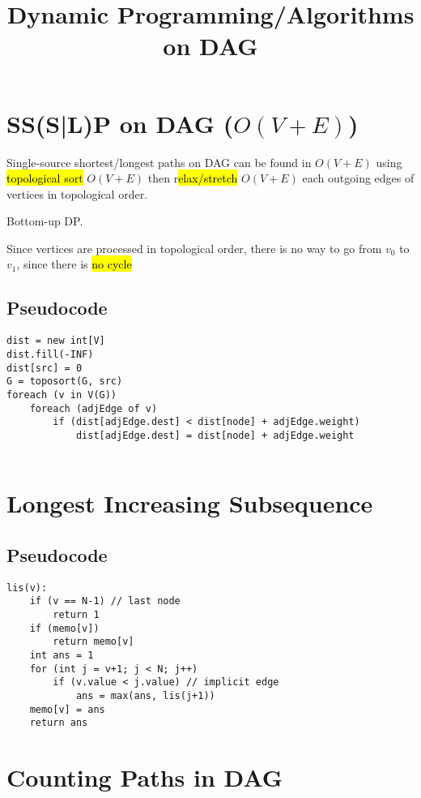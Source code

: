 \documentclass[12pt]{article}
\title{\textbf{Dynamic Programming/Algorithms on DAG}}
\date{}
\begin{document}
\maketitle

\begin{spacing}{1.5}

\section{SS(S|L)P on DAG ($O(V+E)$)}

Single-source shortest/longest paths on DAG can be found in $O(V+E)$ using \hl{topological sort} $O(V+E)$ then r\hl{elax/stretch} $O(V+E)$ each outgoing edges of vertices in topological order. 

Bottom-up DP. 

Since vertices are processed in topological order, there is no way to go from $v_0$ to $v_1$, since there is \hl{no cycle}

\subsection{Pseudocode}

\begin{verbatim}
dist = new int[V]
dist.fill(-INF)
dist[src] = 0
G = toposort(G, src)
foreach (v in V(G))
    foreach (adjEdge of v)
        if (dist[adjEdge.dest] < dist[node] + adjEdge.weight)
            dist[adjEdge.dest] = dist[node] + adjEdge.weight
    
\end{verbatim}


\section{Longest Increasing Subsequence}

\subsection{Pseudocode}

\begin{verbatim}
lis(v): 
    if (v == N-1) // last node
        return 1
    if (memo[v]) 
        return memo[v]
    int ans = 1 
    for (int j = v+1; j < N; j++)
        if (v.value < j.value) // implicit edge
            ans = max(ans, lis(j+1))
    memo[v] = ans
    return ans
\end{verbatim}

\section{Counting Paths in DAG}


\end{spacing}
\end{document}
